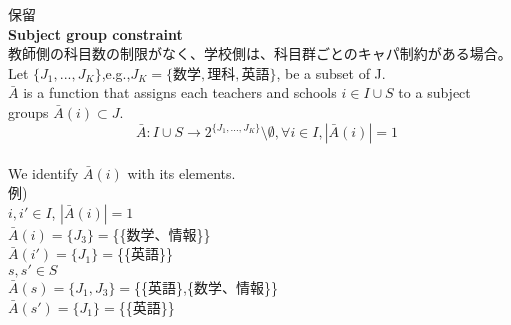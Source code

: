 \documentclass[a4j,10pt]{jsarticle}
\theoremstyle{definition}
\theoremstyle{remark}
\theoremstyle{plain}
\begin{document}















保留\\
\textbf{Subject group constraint}\\
教師側の科目数の制限がなく、学校側は、科目群ごとのキャパ制約がある場合。\\
Let $\{J_1,...,J_K\}$,e.g.,$J_K = \{数学,理科,英語\}$, be a subset of J.\\
$\bar{A}$ is a function that assigns each teachers and schools $i \in I \cup S$ to a subject groups $\bar{A}(i) \subset J$.
\[
\quad \bar{A}: I\cup S \to 2^{\{J_1,...,J_K\}}\setminus {\emptyset}, \forall i \in I, |\bar{A}(i)|=1
\]\\
We identify  $\bar{A}(i)$ with its elements.\\
例)\\
$i,i' \in I $, $|\bar{A}(i)|=1$\\
$\bar{A}(i) = \{J_3\} =$\{\{数学、情報\}\}\\
$\bar{A}(i') = \{J_1\} = $\{\{英語\}\}\\
$s,s' \in S $\\
$\bar{A}(s) = \{J_1,J_3\} = $\{\{英語\},\{数学、情報\}\}\\
$\bar{A}(s') = \{J_1\} = $\{\{英語\}\}\\
\end{document}

